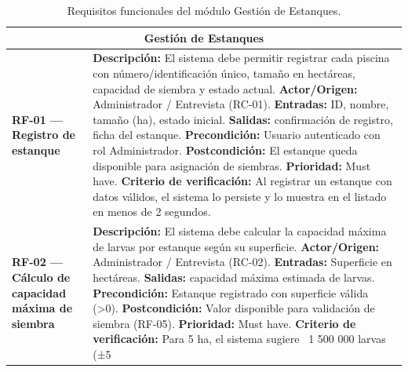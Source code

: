 \documentclass[11pt,a4paper]{article}
\begin{document}
\begin{longtable}{|p{3.5cm}|p{12cm}|}
\caption{Requisitos funcionales del módulo Gestión de Estanques.}
\label{tab:rf-estanques} \\

\hline
\multicolumn{2}{|c|}{\textbf{Gestión de Estanques}} \\ \hline

\textbf{RF-01 — Registro de estanque} &
\textbf{Descripción:} El sistema debe permitir registrar cada piscina con número/identificación único, tamaño en hectáreas, capacidad de siembra y estado actual. \newline
\textbf{Actor/Origen:} Administrador / Entrevista (RC-01). \newline
\textbf{Entradas:} ID, nombre, tamaño (ha), estado inicial. \newline
\textbf{Salidas:} confirmación de registro, ficha del estanque. \newline
\textbf{Precondición:} Usuario autenticado con rol Administrador. \newline
\textbf{Postcondición:} El estanque queda disponible para asignación de siembras. \newline
\textbf{Prioridad:} Must have. \newline
\textbf{Criterio de verificación:} Al registrar un estanque con datos válidos, el sistema lo persiste y lo muestra en el listado en menos de 2 segundos. \\ \hline

\textbf{RF-02 — Cálculo de capacidad máxima de siembra} &
\textbf{Descripción:} El sistema debe calcular la capacidad máxima de larvas por estanque según su superficie. \newline
\textbf{Actor/Origen:} Administrador / Entrevista (RC-02). \newline
\textbf{Entradas:} Superficie en hectáreas. \newline
\textbf{Salidas:} capacidad máxima estimada de larvas. \newline
\textbf{Precondición:} Estanque registrado con superficie válida (>0). \newline
\textbf{Postcondición:} Valor disponible para validación de siembra (RF-05). \newline
\textbf{Prioridad:} Must have. \newline
\textbf{Criterio de verificación:} Para 5 ha, el sistema sugiere ~1 500 000 larvas (±5%
\\ \hline


\end{longtable}
\end{document}
